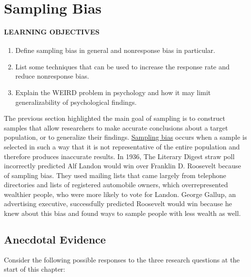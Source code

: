 \documentclass[
]{krantz}
\providecommand{\tightlist}{%
  \setlength{\itemsep}{0pt}\setlength{\parskip}{0pt}}
\begin{document}
\section{Sampling Bias}\label{sampling-bias}

\paragraph*{LEARNING OBJECTIVES}\label{learning-objectives-13}

\begin{enumerate}
\def\labelenumi{\arabic{enumi}.}
\tightlist
\item
  Define sampling bias in general and nonresponse bias in particular.
\item
  List some techniques that can be used to increase the response rate and reduce nonresponse bias.
\item
  Explain the WEIRD problem in psychology and how it may limit generalizability of psychological findings.\\
\end{enumerate}

The previous section highlighted the main goal of sampling is to construct samples that allow researchers to make accurate conclusions about a target population, or to generalize their findings. \hyperref[sampling-bias]{Sampling bias} occurs when a sample is selected in such a way that it is not representative of the entire population and therefore produces inaccurate results. In 1936, The Literary Digest straw poll incorrectly predicted Alf Landon would win over Franklin D. Roosevelt because of sampling bias. They used mailing lists that came largely from telephone directories and lists of registered automobile owners, which overrepresented wealthier people, who were more likely to vote for Landon. George Gallup, an advertising executive, successfully predicted Roosevelt would win because he knew about this bias and found ways to sample people with less wealth as well.

\subsection*{Anecdotal Evidence}\label{anecdotal-evidence}


Consider the following possible responses to the three research questions at the start of this chapter:
\end{document}
